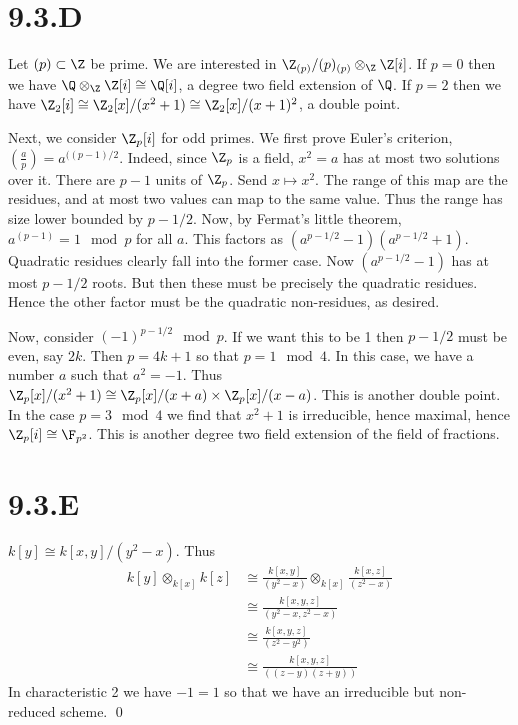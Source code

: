 \documentclass{article}
\begin{document}
\section{9.3.D}
Let $(p) \subset \Z$ be prime. We are interested in
$\Z_{(p)}/(p)_{(p)}
    \otimes_{\Z} \Z[i]$. If $p=0$ then we have
$\Q \otimes_{\Z} \Z[i] \cong
    \Q[i]$, a degree two field extension of
$\Q$. If $p=2$ then we have
$\Z_2[i] \cong \Z_2[x]/(x^2+1) \cong
    \Z_2[x]/(x+1)^2$, a double point.

Next, we consider $\Z_p[i]$ for odd primes. We first prove
Euler's criterion, $(\frac{a}{p})=a^{((p-1)/2}$. Indeed, since
$\Z_p$ is a field, $x^2=a$ has at most two
solutions over it. There are $p-1$ units of
$\Z_p$. Send $x \mapsto x^2$. The range of this map
are the residues, and at most two values can map to the same value. Thus the
range has size lower bounded by $p-1/2$. Now, by Fermat's
little theorem, $a^(p-1)=1 \mod p$ for all $a$. This
factors as $(a^{p-1/2}-1)(a^{p-1/2}+1)$. Quadratic residues clearly fall into the
former case. Now $(a^{p-1/2}-1)$ has at most $p-1/2$
roots. But then these must be precisely the quadratic residues. Hence the other
factor must be the quadratic non-residues, as desired.

Now, consider $(-1)^{p-1/2} \mod p$. If we want this to be 1 then
$p-1/2$ must be even, say $2k$. Then
$p=4k+1$ so that $p = 1 \mod 4$. In this case, we have
a number $a$ such that $a^2=-1$. Thus
$\Z_p[x]/(x^2+1) \cong \Z_p[x]/(x+a) \times
    \Z_p[x]/(x-a)$. This is another double point. In the case
$p=3 \mod 4$ we find that $x^2+1$ is irreducible,
hence maximal, hence $\Z_p[i] \cong \F_{p^2}$. This is another degree two field
extension of the field of fractions.

\section{9.3.E}
$k[y] \cong k[x, y]/(y^2-x)$. Thus
\begin{align*}
    k[y] \otimes_{k[x]} k[z] & \cong \frac{k[x,y]}{(y^2-x)} \otimes_{k[x]} \frac{k[x,z]}{(z^2-x)} \\
                             & \cong \frac{k[x,y,z]}{(y^2-x, z^2-x)}                              \\
                             & \cong \frac{k[x,y,z]}{(z^2-y^2)}                                   \\
                             & \cong \frac{k[x,y,z]}{((z-y)(z+y))}
\end{align*}
In characteristic 2 we have $-1=1$ so that we have an
irreducible but non-reduced scheme. \qed
\end{document}
